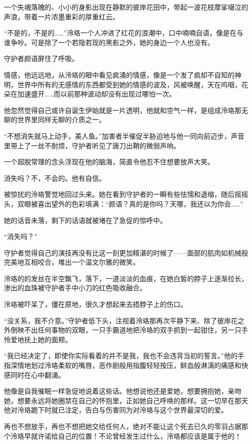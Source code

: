 \documentclass[UTF8, scheme = chinese, openany]{ctexbook}
\begin{document}
\vspace{1.5em}

一个失魂落魄的、小小的身影出现在静默的彼岸花田中，带起一波花枝摩挲啜泣的声浪，带着一片浓墨重彩的厚重红云。

“不是的，不是的……”泠珞一个人冲进了红花的浪潮中，口中喃喃自语，像是在与谁争吵。可是除了一个若隐若现的黑影之外，她的身边一个人也没有。

守护者颜语屏住了呼吸。

情感，他远远地，从泠珞的眼中看见疯涌的情感，像是一个发了疯却不自知的神明，世界中所有的无感情的东西都受到她的情感的波及，风被唤醒，天在呜咽，花朵在加速盛开……而以前那种波动却没有出现过哪怕一次。

他忽然觉得自己或许自诞生伊始就是一片透明，他就和空气一样，是组成泠珞那无聊的世界里同样无聊的介质之一。

“不想消失就马上动手，美人鱼。”加害者半催促半胁迫地与他一同向前迈步，声音里带上了一丝不耐烦，守护者听见了唐刀出鞘的微弱声响。

一个超脱常理的念头浮现在他的脑海，简直令他忍不住想要放声大笑。

消失吗？不，不会的。他有自信。

被惊扰的泠珞警觉地回过头来。她在看到守护者的一瞬有些怯懦和退缩，随后摇摇头，双眼被喜出望外的色彩填满：“颜语？真的是你吗？天哪，我还以为你会……”

她的话音未落，剩下的话语就被堵在了急促的惊呼中。

“消失吗？”

守护者觉得自己的演技再没有比这一刻更加精湛的时候了——面部的肌肉如机械般完美地互相咬合，堆出一个温文尔雅的微笑。

泠珞的的发丝在半空飘飞，落下，一道淡淡的血痕，在她白皙的脖子上逐渐拉长，渗出的血珠被守护者手中小刀的红色吸收融合。

泠珞被吓呆了，僵在原地，很久才想起来去捂脖子上的伤口。

“没关系，我不介意。”守护者低下头，注视着泠珞那再次平静下来、除了彼岸花之外倒映不出任何事物的双眼，一只手霸道地把泠珞的双手抓到一起钳住，另一只手怜爱地抚上她的面颊。

“我已经决定了，即使你实际看着的并不是我，我也不会违背当初的誓言。”他的手指深情地划过泠珞柔软的嘴唇，恶作剧般用指腹轻轻按压，鲜血般淋漓的痛感和快感同时在心中翻涌。

他像是自我催眠一样急促地说着这些话。他想说他还是爱她，想要拥抱她，亲吻她，想要永远将她圈禁在自己的怀抱里，正如她自己呼唤的那样。这一切早在那天他对泠珞跪下时就已注定，告白与伤害同为对泠珞与这个世界最深切的爱。

再也不想放手，再也不想把她交给任何人，绝对不能让这个死去已久的零羽占据那个泠珞早就许诺给自己的位置！不论曾经发生过什么，泠珞都应该是属于他的！
\end{document}

